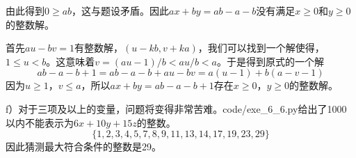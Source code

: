 由此得到$0\ge ab$，这与题设矛盾。因此$ax+by=ab-a-b$没有满足$x\ge0$和$y\ge0$的整数解。\par
{}\par
首先$au-bv=1$有整数解，$(u-kb, v+ka)$，我们可以找到一个解使得，$1\le u<b$。这意味着$v=(au-1)/b<au/b<a$。于是得到原式的一个解
\[ab-a-b+1=ab-a-b+au-bv=a(u-1)+b(a-v-1)\]
因为$u\ge1$，$v\le a$，所以$ax+by=ab-a-b+1$存在$x\ge0$，$y\ge0$的整数解。\par
f）对于三项及以上的变量，问题将变得非常苦难。code/exe\_6\_6.py给出了1000以内不能表示为$6x+10y+15z$的整数。
\[\{1, 2, 3, 4, 5, 7, 8, 9, 11, 13, 14, 17, 19, 23, 29\}\]
因此猜测最大符合条件的整数是29。